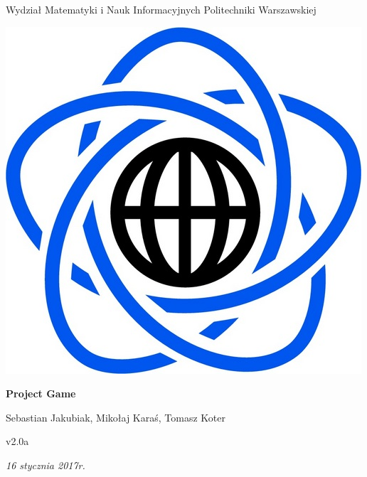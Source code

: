 \documentclass[11pt]{article}
\begin{document}
\begin{titlepage}
\centering

{\large Wydział Matematyki i Nauk Informacyjnych Politechniki Warszawskiej}

\vspace{1cm}
\includegraphics[scale=0.15]{../res/logo}
\vspace{3cm}

{\Huge\bfseries Project Game}

\vspace{1cm}

{\Large Sebastian Jakubiak, Mikołaj Karaś, Tomasz Koter}

\vspace{1cm}

{\large v2.0a}

\vspace{1cm}

\vfill

{\itshape {\large 16 stycznia 2017r.}}
\end{titlepage}

\tableofcontents
\end{document}
